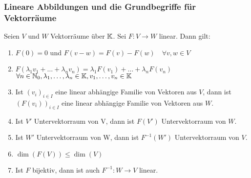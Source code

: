 \subsubsection{Lineare Abbildungen und die Grundbegriffe für Vektorräume}
\begin{propn}
	Seien $ V $ und $ W $ Vektorräume über $ \mathbb K $. Sei $ F: V \to W $ linear. Dann gilt:
	\begin{enumerate}
		\item
			$ F(0) = 0 $ und $ F(v-w) = F(v) - F(w) \quad \forall v,w \in V $
		\item
			$ F(\lambda_1 v_1 + \ldots + \lambda_n v_n) = \lambda_1 F(v_1) + \ldots + \lambda_n F(v_n) $ \\ $ \forall n \in \mathbb N_0, \lambda_1, \ldots, \lambda_n \in \mathbb K, v_1, \ldots, v_n \in \mathbb K $
		\item
			Ist $ (v_i)_{i \in I} $ eine linear abhängige Familie von Vektoren aus $ V $, dann ist $ (F(v_i))_{i \in I} $ eine linear abhängige Familie von Vektoren aus $ W $.
		\item
			Ist $ V' $ Untervektorraum von V, dann ist $ F(V') $ Untervektorraum von $ W $.
		\item
			Ist $ W' $ Untervektorraum von W, dann ist $ F^{-1}(W') $ Untervektorraum von $ V $.
		\item
			$ \dim(F(V)) \leq \dim(V) $
		\item
			Ist $ F $ bijektiv, dann ist auch $ F^{-1} : W \to V $ linear.
	\end{enumerate}
\end{propn}

